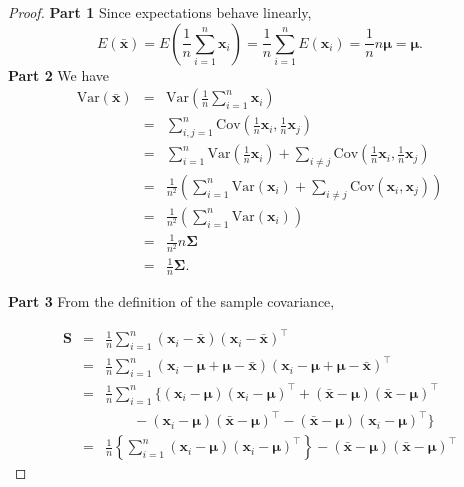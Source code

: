 \documentclass[]{book}
\theoremstyle{definition}
\theoremstyle{definition}
\theoremstyle{definition}
\theoremstyle{remark}
\begin{document}
\begin{proof}
{}\textbf{Part 1} Since expectations behave linearly,
\[E(\bar{\boldsymbol x}) = E \left(\frac{1}{n} \sum_{i=1}^n \boldsymbol x_i \right)= \frac{1}{n} \sum_{i=1}^n E(\boldsymbol x_i) = \frac{1}{n} n \boldsymbol \mu= \boldsymbol \mu.\]
\textbf{Part 2}
We have
\begin{eqnarray*}
\text{Var}(\bar{\boldsymbol x}) &=& \text{Var} \left(\frac{1}{n} \sum_{i=1}^n \boldsymbol x_i \right)\\
&=& \sum_{i,j=1}^n \text{Cov}\left (\frac{1}{n}\boldsymbol x_i, \frac{1}{n}\boldsymbol x_j \right)\\
&=& \sum_{i=1}^n \text{Var} \left(\frac{1}{n} \boldsymbol x_i \right)+ \sum_{i \neq j} \text{Cov} \left(\frac{1}{n} \boldsymbol x_i, \frac{1}{n} \boldsymbol x_j \right)\\
&=& \frac{1}{n^2} \left(\sum_{i=1}^n \text{Var}(\boldsymbol x_i) + \sum_{i \neq j} \text{Cov}(\boldsymbol x_i,\boldsymbol x_j) \right)\\
&=& \frac{1}{n^2} \left(\sum_{i=1}^n \text{Var}(\boldsymbol x_i) \right)\\
&=& \frac{1}{n^2} n \boldsymbol \Sigma\\
&=& \frac{1}{n} \boldsymbol \Sigma.
\end{eqnarray*}

\textbf{Part 3} From the definition of the sample covariance,

\begin{eqnarray*}
\boldsymbol S&=& \frac{1}{n} \sum_{i=1}^n  (\boldsymbol x_i -\bar{\boldsymbol x})( \boldsymbol x_i - \bar{\boldsymbol x})^\top \\
&=& \frac{1}{n} \sum_{i=1}^n (\boldsymbol x_i - \boldsymbol \mu+ \boldsymbol \mu-\bar{\boldsymbol x})(\boldsymbol x_i - \boldsymbol \mu+\boldsymbol \mu-\bar{\boldsymbol x})^\top  \\
&=& \frac{1}{n} \sum_{i=1}^n \bigg \{(\boldsymbol x_i - \boldsymbol \mu)(\boldsymbol x_i - \boldsymbol \mu)^\top +(\bar{\boldsymbol x}-\boldsymbol \mu)(\bar{\boldsymbol x}-\boldsymbol \mu)^\top \\
&&  \qquad -(\boldsymbol x_i-\boldsymbol \mu)(\bar{\boldsymbol x}-\boldsymbol \mu)^\top -(\bar{\boldsymbol x}-\boldsymbol \mu)(\boldsymbol x_i-\boldsymbol \mu)^\top \bigg \}\\
&=& \frac{1}{n} \left \{\sum_{i=1}^n (\boldsymbol x_i - \boldsymbol \mu)(\boldsymbol x_i - \boldsymbol \mu)^\top \right \}- (\bar{\boldsymbol x}-\boldsymbol \mu)(\bar{\boldsymbol x}-\boldsymbol \mu)^\top
\end{eqnarray*}


\end{proof}
\end{document}

